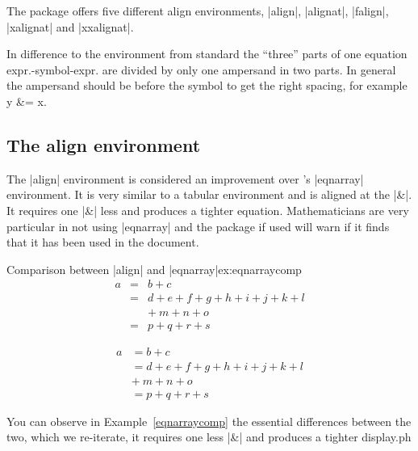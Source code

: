 
The  package offers five different align environments, |align|, |alignat|, |falign|, |xalignat| and |xxalignat|. 

In difference to the  environment from standard \latex the ``three'' parts of one equation expr.-symbol-expr. are divided by only one ampersand in two parts. In general the ampersand should be before the symbol to get the right spacing, for example y \&= x. 

\subsection{The align environment}

The |align| environment is considered an improvement over \latex's |eqnarray| environment. It is very similar to a tabular
environment and is aligned at the |&|. 
It requires one |&| less and produces a tighter equation. Mathematicians 
are very particular in not using |eqnarray| and the package 
 if used will warn if it finds that it has been used in the document. 


\begin{texexample}{Comparison between |align| and |eqnarray|}{ex:eqnarraycomp}
\begin{eqnarray}
a & = & b + c \\
  & = & d + e + f + g + h + i
        + j + k + l \nonumber \\
  &   & +\: m + n + o \\
  & = & p + q + r + s
\end{eqnarray}

\begin{align}
a & =  b + c \\
  & =  d + e + f + g + h + i
       + j + k + l \nonumber \\
  & +\: m + n + o \\
  & =  p + q + r + s
\end{align}
\end{texexample}

You can observe in Example~\ref{eqnarraycomp} the essential differences between the two, which we re-iterate, it requires one less |&| and produces a tighter display.ph


